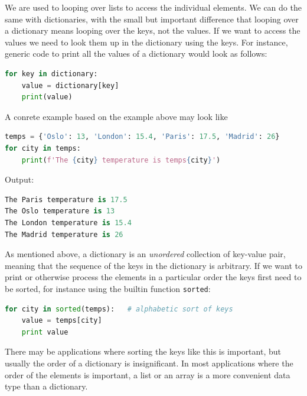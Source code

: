 \documentclass[graybox,envcountchap,sectrefs,final]{svmonodo}
\begin{document}
We are used to looping over lists to access the individual elements. We can do the same with dictionaries, with the
small but important difference that looping over a dictionary means looping over the keys, not the values. If we
want to access the values we need to look them up in the dictionary using the keys. For instance, generic code
to print all the values of a dictionary would look as follows:
\begin{lstlisting}[language=Python,style=blue1]
for key in dictionary:
    value = dictionary[key]
    print(value)
\end{lstlisting}
A conrete example based on the example above may look like
\begin{lstlisting}[language=Python,style=blue1]
temps = {'Oslo': 13, 'London': 15.4, 'Paris': 17.5, 'Madrid': 26}
for city in temps:
    print(f'The {city} temperature is temps{city}')
\end{lstlisting}
Output:
\begin{lstlisting}[language=Python,style=gray]
The Paris temperature is 17.5
The Oslo temperature is 13
The London temperature is 15.4
The Madrid temperature is 26
\end{lstlisting}
As mentioned above, a dictionary is an \emph{unordered} collection of key-value pair, meaning that the
sequence of the keys in the dictionary is arbitrary. If we want to print or otherwise process
the elements in a particular order the keys first need to be sorted, for instance using the builtin
function \texttt{sorted}:
\begin{lstlisting}[language=Python,style=blue1]
for city in sorted(temps):   # alphabetic sort of keys
    value = temps[city]
    print value
\end{lstlisting}
There may be applications where sorting the keys like this is important, but usually the order of a dictionary
is insignificant. In most applications where the order of the elements is important, a list or an array is a more
convenient data type than a dictionary.
\end{document}
